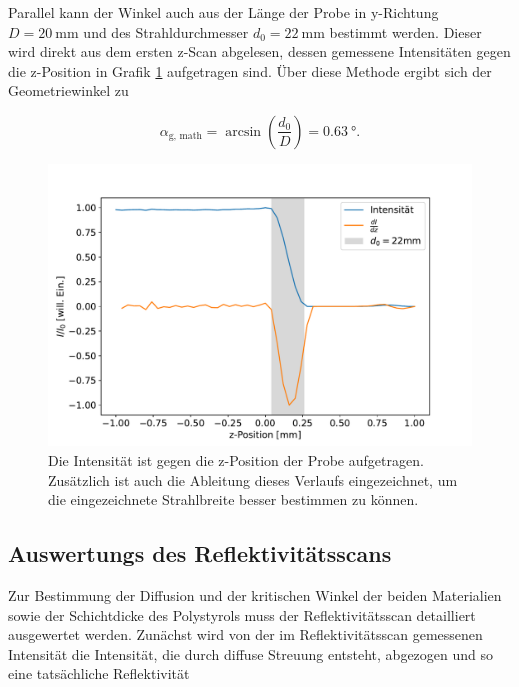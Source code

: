     \FloatBarrier

    Parallel kann der Winkel auch aus der Länge der Probe in y-Richtung $D=\SI{20}{\milli\metre}$ und des Strahldurchmesser $d_0=\SI{22}{\milli\metre}$ bestimmt werden. Dieser wird direkt aus dem ersten z-Scan 
    abgelesen, dessen gemessene Intensitäten gegen die z-Position in Grafik \ref{fig:zscan} aufgetragen sind. Über diese Methode ergibt sich der Geometriewinkel zu

    \begin{equation*}
      \alpha_{\text{g, math}} = \arcsin\left(\frac{d_0}{D}\right) = \SI{0.63}{\degree}.
    \end{equation*}

    \FloatBarrier
    \begin{figure}[h]
        \centering
        \includegraphics[width = \textwidth]{abschattung.pdf}
        \caption{Die Intensität ist gegen die z-Position der Probe aufgetragen. Zusätzlich ist auch die Ableitung dieses Verlaufs eingezeichnet, um die eingezeichnete Strahlbreite besser bestimmen zu können.}
        \label{fig:zscan}
      \end{figure}
  
    \FloatBarrier


  \subsection{Auswertungs des Reflektivitätsscans}
    Zur Bestimmung der Diffusion und der kritischen Winkel der beiden Materialien sowie der Schichtdicke des Polystyrols muss der Reflektivitätsscan detailliert ausgewertet werden. Zunächst wird von der im 
    Reflektivitätsscan gemessenen Intensität die Intensität, die durch diffuse Streuung entsteht, abgezogen und so eine tatsächliche Reflektivität 
    
